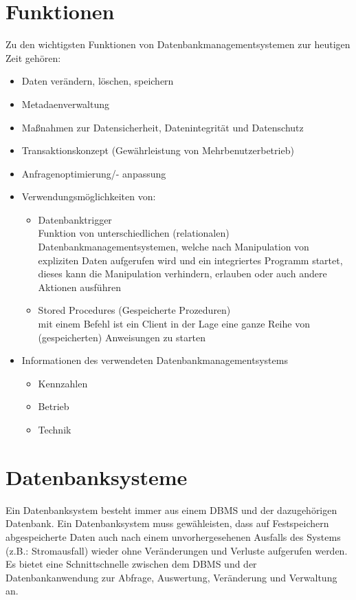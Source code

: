 \documentclass[12pt,a4paper]{report}
\begin{document}
\begin{onehalfspace}
\section{Funktionen}
Zu den wichtigsten Funktionen von Datenbankmanagementsystemen zur heutigen Zeit gehören:
\begin{itemize}
\item Daten verändern, löschen, speichern
\item Metadaenverwaltung
\item Maßnahmen zur Datensicherheit, Datenintegrität und Datenschutz
\item Transaktionskonzept (Gewährleistung von Mehrbenutzerbetrieb)
\item Anfragenoptimierung/- anpassung
\item Verwendungsmöglichkeiten von: 
\begin{itemize}
\item Datenbanktrigger\\
Funktion von unterschiedlichen (relationalen) Datenbankmanagementsystemen, welche nach Manipulation von expliziten Daten aufgerufen wird und ein integriertes Programm startet, dieses kann die Manipulation verhindern, erlauben oder auch andere Aktionen ausführen
\item Stored Procedures (Gespeicherte Prozeduren)\\
mit einem Befehl ist ein Client in der Lage eine ganze Reihe von (gespeicherten) Anweisungen zu starten
\end{itemize}
\item Informationen des verwendeten Datenbankmanagementsystems
\begin{itemize}
\item Kennzahlen
\item Betrieb
\item Technik
\end{itemize}
\end{itemize}

\section{Datenbanksysteme}
Ein Datenbanksystem besteht immer aus einem DBMS und der dazugehörigen Datenbank. Ein Datenbanksystem muss gewähleisten, dass auf Festspeichern abgespeicherte Daten auch nach einem unvorhergesehenen Ausfalls des Systems (z.B.: Stromausfall) wieder ohne Veränderungen und Verluste aufgerufen werden.\\
Es bietet eine Schnittschnelle zwischen dem DBMS und der Datenbankanwendung zur  Abfrage, Auswertung, Veränderung und Verwaltung an.


\end{onehalfspace}
\end{document}
